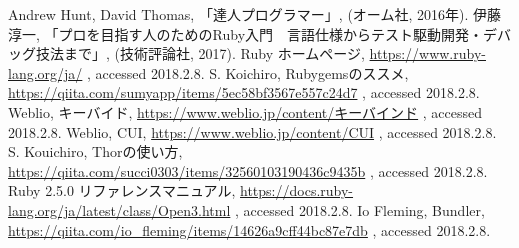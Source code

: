\begin{thebibliography}{9}
 Andrew Hunt, David Thomas, 「達人プログラマー」, (オーム社, 2016年).
伊藤淳一, 「プロを目指す人のためのRuby入門　言語仕様からテスト駆動開発・デバッグ技法まで」, (技術評論社, 2017).
 Ruby ホームページ, \url{https://www.ruby-lang.org/ja/} , accessed 2018.2.8.
 S. Koichiro, Rubygemsのススメ, \url{https://qiita.com/sumyapp/items/5ec58bf3567e557c24d7} , accessed 2018.2.8.
 Weblio, キーバイド, \url{https://www.weblio.jp/content/キーバインド} , accessed 2018.2.8.
 Weblio, CUI, \url{https://www.weblio.jp/content/CUI} , accessed 2018.2.8.
 S. Kouichiro, Thorの使い方, \url{https://qiita.com/succi0303/items/32560103190436c9435b} , accessed 2018.2.8.
 Ruby 2.5.0 リファレンスマニュアル, \url{https://docs.ruby-lang.org/ja/latest/class/Open3.html} , accessed 2018.2.8.
 Io Fleming, Bundler, \url{https://qiita.com/io_fleming/items/14626a9cff44bc87e7db} , accessed 2018.2.8.
\end{thebibliography}    